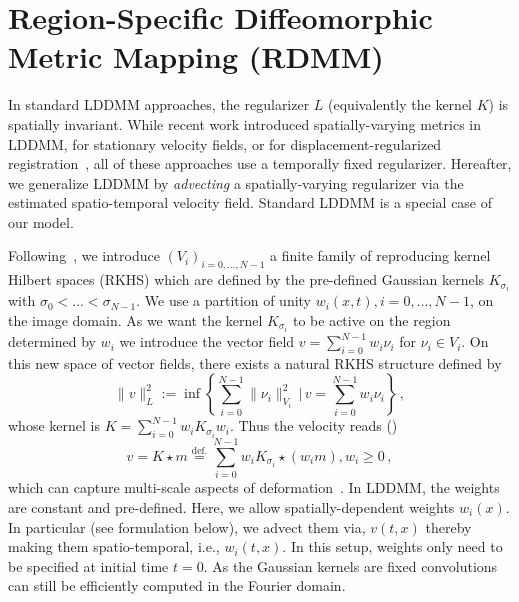 \documentclass{article}
\numberwithin{equation}{section}
\newcommand{\ie}{{i.e.}}
\newcommand{\zy}[1]{{\color{black}{#1}}}
\begin{document}
\section{Region-Specific Diffeomorphic Metric Mapping (RDMM)}
\label{sec:rdmm}

In standard LDDMM approaches, the regularizer $L$ (equivalently the kernel $K$) is spatially invariant. While recent work introduced spatially-varying metrics in LDDMM, for stationary velocity fields, or for displacement-regularized registration~\citep{risser2013piecewise,schmah2013left,niethammer2019_cvpr,pace2013locally}, all of these approaches use a temporally fixed regularizer. Hereafter, we generalize LDDMM by \emph{advecting} a spatially-varying  regularizer via the estimated spatio-temporal velocity field. Standard LDDMM is a special case of our model. 

Following~\citep{niethammer2019_cvpr}, we introduce $(V_i)_{i = 0,\ldots,N-1}$ a finite family of reproducing kernel Hilbert spaces (RKHS) which are defined by the pre-defined Gaussian kernels $K_{\sigma_i}$ with $\sigma_0 < \ldots < \sigma_{N-1}$. We use a partition of unity $w_i(x,t),{i=0,\ldots,N-1}$, on the image domain. As we want the kernel $K_{\sigma_i}$ to be active on the region determined by $w_i$ we introduce the vector field $v = \sum_{i=0}^{N-1} w_i \nu_i$ for $\nu_i \in V_i$. On this new space of vector fields, there exists a natural RKHS structure defined by
\begin{equation}
\| v \|^2_L := \inf \left\{ \sum_{i=0}^{N-1} \|\nu_i \|^2_{V_i}\,| \, v = \sum_{i=0}^{N-1} w_i \nu_i \right\}\,,
\end{equation}
whose kernel is $K = \sum_{i=0}^{N-1} w_i K_{\sigma_i} w_i$. 
 Thus the velocity reads (\zy{see suppl.~\ref{sec:kernel} for the derivation})
\begin{equation}
v=K \star m \stackrel{\mathrm{def.}}{=} \sum_{i=0}^{N-1} w_{i} K_{\sigma_i} \star (w_{i}m), w_{i} \geq 0\, ,
\label{eq:velocity_relationship}
\end{equation}
 which can capture multi-scale aspects of deformation~\cite{risser2010simultaneous}. In LDDMM, the weights are constant and pre-defined. Here, we allow spatially-dependent weights $w_i(x)$. In particular (see formulation below), we advect them via, $v(t,x)$ thereby making them spatio-temporal, \ie, $w_i(t,x)$. In this setup, weights only need to be specified at initial time $t=0$. As the Gaussian kernels are fixed convolutions can still be efficiently computed in the Fourier domain.
\end{document}
